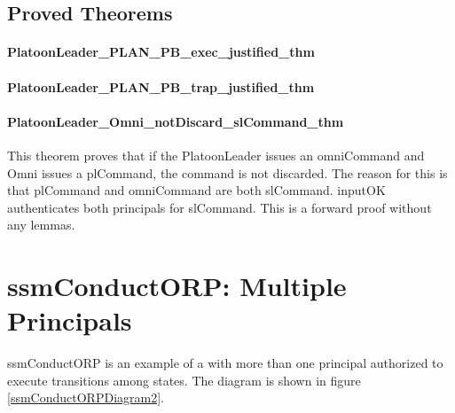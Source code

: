 \documentclass[../../main/main.tex]{subfiles}
\begin{document}
\HOLPBIntegratedDefDefinitionssecAuthorizationXXdef

\HOLPBIntegratedDefDefinitionssecHelperXXdef


\subsection{Proved Theorems}

\paragraph*{PlatoonLeader_PLAN_PB_exec_justified_thm}
\HOLssmPBIntegratedTheoremsPlatoonLeaderXXPLANXXPBXXexecXXjustifiedXXthm
\HOLssmPBIntegratedTheoremsPlatoonLeaderXXPLANXXPBXXexecXXlemma

\paragraph*{PlatoonLeader_PLAN_PB_trap_justified_thm}
\HOLssmPBIntegratedTheoremsPlatoonLeaderXXPLANXXPBXXtrapXXjustifiedXXlemma
\HOLssmPBIntegratedTheoremsPlatoonLeaderXXPLANXXPBXXtrapXXjustifiedXXthm
\HOLssmPBIntegratedTheoremsPlatoonLeaderXXPLANXXPBXXtrapXXlemma

\paragraph*{PlatoonLeader_Omni_notDiscard_slCommand_thm}
This theorem proves that if the PlatoonLeader issues an omniCommand and Omni issues a plCommand, the command is not discarded.  The reason for this is that plCommand and omniCommand are both slCommand.  inputOK authenticates both principals for slCommand.  This is a forward proof without any lemmas.

\HOLssmPBIntegratedTheoremsPlatoonLeaderXXOmniXXnotDiscardXXslCommandXXthm

     
\section{ssmConductORP: Multiple Principals}
ssmConductORP is an example of a  with more than one principal authorized to execute transitions among states. The diagram is shown in figure \ref{ssmConductORPDiagram2}.
\end{document}
